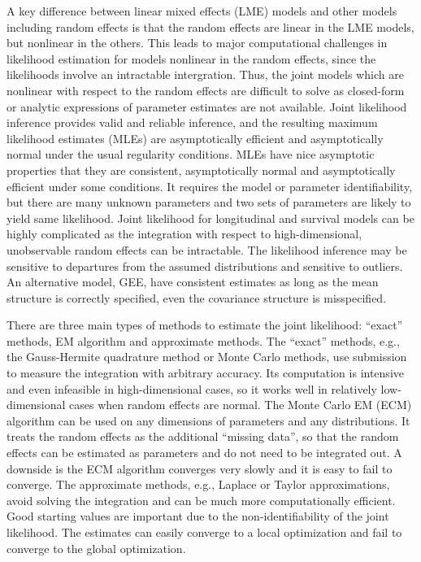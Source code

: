 A key difference between linear mixed effects (LME) models and other models including random effects is that the random effects are linear in the LME models, but nonlinear in the others. This leads to major computational challenges in likelihood estimation for models nonlinear in the random effects, since the likelihoods involve an intractable intergration. Thus, the joint models which are nonlinear with respect to the random effects are difficult to solve as closed-form or analytic expressions of parameter estimates are not available. Joint likelihood inference provides valid and reliable inference, and the resulting maximum likelihood estimates (MLEs) are asymptotically efficient and asymptotically normal under the usual regularity conditions. MLEs have nice asymptotic properties that they are consistent, asymptotically normal and asymptotically efficient under some conditions. It requires the model or parameter identifiability, but there are many unknown parameters and two sets of parameters are likely to yield same likelihood. 
Joint likelihood for longitudinal and survival models can be highly complicated as the integration with respect to high-dimensional, unobservable random effects can be intractable. The likelihood inference may be sensitive to departures from the assumed distributions and sensitive to outliers. An alternative model, GEE, have consistent estimates as long as the mean structure is correctly specified, even the covariance structure is misspecified.

There are three main types of methods to estimate the joint likelihood:  ``exact'' methods, EM algorithm and approximate methods. The ``exact'' methods, e.g., the Gauss-Hermite quadrature method or Monte Carlo methods, use submission to measure the integration with arbitrary accuracy. Its computation is intensive and even infeasible in high-dimensional cases, so it works well in relatively low-dimensional cases when random effects are normal. The Monte Carlo EM (ECM) algorithm can be used on any dimensions of parameters and any distributions. It treats the random effects as the additional ``missing data'', so that the random effects can be estimated as parameters and do not need to be integrated out. A downside is the ECM algorithm converges very slowly and it is easy to fail to converge. The approximate methods, e.g., Laplace or Taylor approximations, avoid solving the integration and can be much more computationally efficient. Good starting values are important due to the non-identifiability of the joint likelihood. The estimates can easily converge to a local optimization and fail to converge to the global optimization. 


